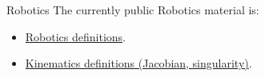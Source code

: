 \documentclass[hidelinks]{article}
\begin{document}
\begin{sfragment}{Robotics}
The currently public Robotics material is:
\begin{itemize}
    \item \href{/:sTeX/browser?archive=ABadyal\&filepath=Robotics/Robotics_defs.xhtml}{Robotics definitions}.
    \item \href{/:sTeX/browser?archive=ABadyal\&filepath=Robotics/Kinematics/Kinematics_defs.xhtml}{Kinematics definitions (Jacobian, singularity)}.
\end{itemize}
\end{sfragment}
\end{document}
